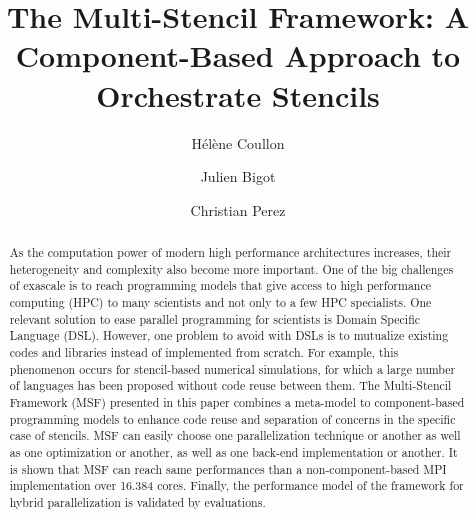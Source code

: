 \documentclass[smallextended]{svjour3}       %
\begin{document}

\title{The Multi-Stencil Framework: A Component-Based Approach to Orchestrate Stencils}
\author{H\'el\`ene Coullon \and Julien Bigot \and Christian Perez}
\maketitle
\begin{abstract}
As the computation power of modern high performance architectures increases, their heterogeneity and complexity also become more important. One of the big challenges of exascale is to reach programming models that give access to high performance computing (HPC) to many scientists and not only to a few HPC specialists. One relevant solution to ease parallel programming for scientists is Domain Specific Language (DSL). However, one problem to avoid with DSLs is to mutualize existing codes and libraries instead of implemented from scratch. For example, this phenomenon occurs for stencil-based numerical simulations, for which a large number of languages has been proposed without code reuse between them. 
The Multi-Stencil Framework (MSF) presented in this paper combines a meta-model to component-based programming models to enhance code reuse and separation of concerns in the specific case of stencils. MSF can easily choose one parallelization technique or another as well as one optimization or another, as well as one back-end implementation or another. It is shown that MSF can reach same performances than a non-component-based MPI implementation over 16.384 cores. Finally, the performance model of the framework for hybrid parallelization is validated by evaluations.

\end{abstract}
\end{document}

